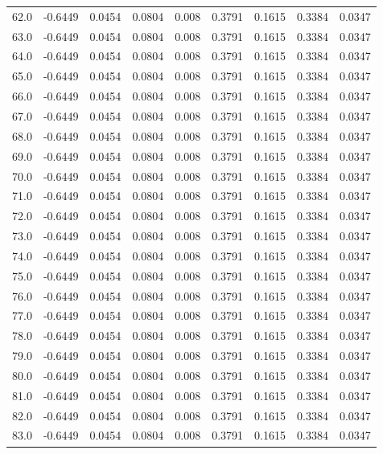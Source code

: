 \begin{longtable}{lrrrrrrrr}
62.0 & -0.6449 & 0.0454 & 0.0804 & 0.008 & 0.3791 & 0.1615 & 0.3384 & 0.0347 \\
63.0 & -0.6449 & 0.0454 & 0.0804 & 0.008 & 0.3791 & 0.1615 & 0.3384 & 0.0347 \\
64.0 & -0.6449 & 0.0454 & 0.0804 & 0.008 & 0.3791 & 0.1615 & 0.3384 & 0.0347 \\
65.0 & -0.6449 & 0.0454 & 0.0804 & 0.008 & 0.3791 & 0.1615 & 0.3384 & 0.0347 \\
66.0 & -0.6449 & 0.0454 & 0.0804 & 0.008 & 0.3791 & 0.1615 & 0.3384 & 0.0347 \\
67.0 & -0.6449 & 0.0454 & 0.0804 & 0.008 & 0.3791 & 0.1615 & 0.3384 & 0.0347 \\
68.0 & -0.6449 & 0.0454 & 0.0804 & 0.008 & 0.3791 & 0.1615 & 0.3384 & 0.0347 \\
69.0 & -0.6449 & 0.0454 & 0.0804 & 0.008 & 0.3791 & 0.1615 & 0.3384 & 0.0347 \\
70.0 & -0.6449 & 0.0454 & 0.0804 & 0.008 & 0.3791 & 0.1615 & 0.3384 & 0.0347 \\
71.0 & -0.6449 & 0.0454 & 0.0804 & 0.008 & 0.3791 & 0.1615 & 0.3384 & 0.0347 \\
72.0 & -0.6449 & 0.0454 & 0.0804 & 0.008 & 0.3791 & 0.1615 & 0.3384 & 0.0347 \\
73.0 & -0.6449 & 0.0454 & 0.0804 & 0.008 & 0.3791 & 0.1615 & 0.3384 & 0.0347 \\
74.0 & -0.6449 & 0.0454 & 0.0804 & 0.008 & 0.3791 & 0.1615 & 0.3384 & 0.0347 \\
75.0 & -0.6449 & 0.0454 & 0.0804 & 0.008 & 0.3791 & 0.1615 & 0.3384 & 0.0347 \\
76.0 & -0.6449 & 0.0454 & 0.0804 & 0.008 & 0.3791 & 0.1615 & 0.3384 & 0.0347 \\
77.0 & -0.6449 & 0.0454 & 0.0804 & 0.008 & 0.3791 & 0.1615 & 0.3384 & 0.0347 \\
78.0 & -0.6449 & 0.0454 & 0.0804 & 0.008 & 0.3791 & 0.1615 & 0.3384 & 0.0347 \\
79.0 & -0.6449 & 0.0454 & 0.0804 & 0.008 & 0.3791 & 0.1615 & 0.3384 & 0.0347 \\
80.0 & -0.6449 & 0.0454 & 0.0804 & 0.008 & 0.3791 & 0.1615 & 0.3384 & 0.0347 \\
81.0 & -0.6449 & 0.0454 & 0.0804 & 0.008 & 0.3791 & 0.1615 & 0.3384 & 0.0347 \\
82.0 & -0.6449 & 0.0454 & 0.0804 & 0.008 & 0.3791 & 0.1615 & 0.3384 & 0.0347 \\
83.0 & -0.6449 & 0.0454 & 0.0804 & 0.008 & 0.3791 & 0.1615 & 0.3384 & 0.0347 \\

\end{longtable}
